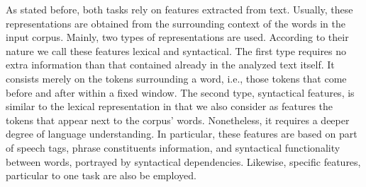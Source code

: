 
As stated before, both tasks rely on features extracted from text. Usually, these representations are obtained from the surrounding context of the words in the  input corpus. Mainly,  two types of representations are used. According to their nature we call these features lexical and syntactical. 	The first type requires no extra information than that contained already in the analyzed text itself. It consists merely on the tokens surrounding a word, i.e., those tokens that come before and after within a fixed window. The second type, syntactical features, is similar to the lexical representation in that we also consider as features the tokens that appear next to the corpus' words. Nonetheless, it requires a deeper degree of language understanding. In particular, these features are based on part of speech tags, phrase constituents information, and syntactical functionality between words, portrayed by syntactical dependencies. Likewise, specific features, particular to one task are also be employed.



